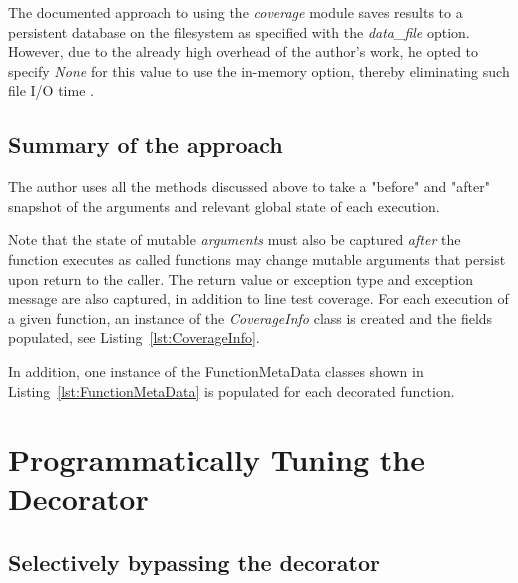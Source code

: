 \documentclass[10pt, conference]{IEEEtran}
\begin{document}
The documented approach to using the \textit{coverage} module 
saves results to a persistent database on the filesystem as specified with the 
\textit{data\_file} option. However, due to the already high overhead of the 
author's work, he opted to specify \textit{None} for this value to use the in-memory 
option, thereby eliminating such file I/O time \cite{batchelder2024}.

\subsection{Summary of the approach}\label{sec:approach-internal-5}

The author uses all the methods discussed above to take a "before" and "after" 
snapshot of the arguments and relevant global state of each execution. 

Note that the state of mutable \textit{arguments} must also be captured 
\textit{after} the function executes as called functions may change mutable 
arguments that persist upon return to the caller. The return value or exception 
type and exception message are also captured, in addition to line test coverage. 
For each execution of a given function, an instance of the 
\textit{CoverageInfo} class is created and the fields populated, see 
Listing~\ref{lst:CoverageInfo}.


In addition, one instance of the FunctionMetaData classes shown in 
Listing~\ref{lst:FunctionMetaData} is populated for each decorated function.



\section{Programmatically Tuning the Decorator}\label{sec:decorator tuning}

\subsection{Selectively bypassing the decorator}\label{sec:tuning-1}
\end{document}
